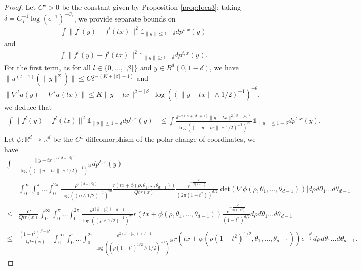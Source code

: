 \documentclass{article}
\begin{document}
\begin{proof}Let $C^\star>0$ be the constant given by Proposition \ref{prop:loca3};
taking $\delta=C_\star^{-1}\log(\epsilon^{-1})^{-C_\star}$, we provide separate bounds on 
    \begin{align*}
     \int \|f^l(y)-f^l(tx)\|^2\mathds{1}_{\|y\|\leq 1-\delta}dp^{t,x}(y)        
\end{align*}   
and
\begin{align*}  
     \int \|f^l(y)-f^l(tx)\|^2\mathds{1}_{\|y\|\geq 1-\delta}dp^{t,x}(y).
\end{align*}
For the first term,  as for all $l\in \{0,...,\lfloor \beta\rfloor\}$ and $y\in B^d(0,1-\delta)$, we have $\|u^{(l+1)}(\|y\|^2)\|\leq C \delta^{-(K+\lfloor \beta \rfloor+1)}$ and $\|\nabla^la(y)-\nabla^la(tx)\|\leq K\|y-tx\|^{\beta-\lfloor \beta \rfloor }\log((\|y-tx\|\wedge 1/2)^{-1})^{-\theta}$, we deduce that
\begin{align*}
    \int \|f^l(y)-f^l(tx)\|^2\mathds{1}_{\|y\|\leq 1-\delta}dp^{t,x}(y) & \leq \int \frac{\delta^{-2(K+\lfloor \beta \rfloor+1)}\|y-tx\|^{2(\beta-\lfloor \beta \rfloor )}}{\log((\|y-tx\|\wedge 1/2)^{-1})^{2\theta}}\mathds{1}_{\|y\|\leq 1-\delta}dp^{t,x}(y).
\end{align*}
Let $\phi:\mathbb{R}^d\rightarrow \mathbb{R}^d$ be the $C^1$ diffeomorphism of the polar change of coordinates, we have 
\begin{align*}
    \int&\frac{\|y-tx\|^{2(\beta-\lfloor \beta \rfloor )}}{\log((\|y-tx\|\wedge 1/2)^{-1})^{2\theta}}dp^{t,x}(y)\\
     = &\int_0^\infty\int_0^\pi... \int_0^{2\pi} \frac{\rho^{2(\beta-\lfloor \beta \rfloor) }}{\log((\rho\wedge 1/2)^{-1})^{2\theta}}\frac{r(tx +\phi(\rho,\theta_1,...,\theta_{d-1}))}{Qtr(x)} \frac{e^{-\frac{\rho^2}{2(1-t^2)}}}{(2\pi(1-t^2))^{d/2}}|\text{det}(\nabla \phi(\rho,\theta_1,...,\theta_{d-1}))|d\rho d\theta_1...d\theta_{d-1}\\
    \leq & \frac{C}{Qtr(x)}\int_0^{\infty}\int_0^\pi... \int_0^{2\pi} \frac{\rho^{2(\beta-\lfloor \beta \rfloor) +d-1 }}{\log((\rho\wedge 1/2)^{-1})^{2\theta}}r(tx +\phi(\rho,\theta_1,...,\theta_{d-1}))\frac{e^{-\frac{\rho^2}{2(1-t^2)}}}{(1-t^2)^{d/2}}d\rho d\theta_1...d\theta_{d-1}\\
    \leq & \frac{(1-t^2)^{\beta-\lfloor \beta \rfloor}}{Qtr(x)}\int_0^{\infty}\int_0^\pi... \int_0^{2\pi} \frac{\rho^{2(\beta-\lfloor \beta \rfloor) +d-1 }}{\log((\rho(1-t^2)^{1/2}\wedge 1/2)^{-1})^{2\theta}}r(tx +\phi(\rho(1-t^2)^{1/2},\theta_1,...,\theta_{d-1}))e^{-\frac{\rho^2}{2}}d\rho d\theta_1...d\theta_{d-1}.

\end{align*}
\end{proof}
\end{document}
